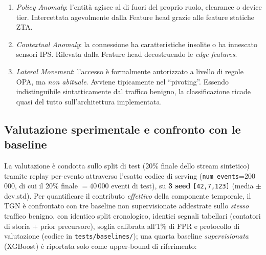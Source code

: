 \documentclass[11pt,a4paper]{report}
\begin{document}
\begin{enumerate}
    \item \textit{Policy Anomaly}: l'entità agisce al di fuori del proprio ruolo, clearance o device tier. Intercettata agevolmente dalla Feature head grazie alle feature statiche ZTA.
    \item \textit{Contextual Anomaly}: la connessione ha caratteristiche insolite o ha innescato sensori IPS. Rilevata dalla Feature head decostruendo le \textit{edge features}.
    \item \textit{Lateral Movement}: l'accesso è formalmente autorizzato a livello di regole OPA, ma \textit{non abituale}. Avviene tipicamente nel ``pivoting''. Essendo indistinguibile sintatticamente dal traffico benigno, la classificazione ricade quasi del tutto sull'architettura implementata.
\end{enumerate}

\subsection{Valutazione sperimentale e confronto con le baseline}
\label{sec:eval}

La valutazione è condotta sullo split di test (20\% finale dello stream sintetico) tramite replay per-evento attraverso l'esatto codice di serving (\texttt{num\_events}=200\,000, di cui il 20\% finale $=40\,000$ eventi di test), su \textbf{3 seed} \texttt{[42,7,123]} (media $\pm$ dev.std). Per quantificare il contributo \emph{effettivo} della componente temporale, il TGN è confrontato con tre baseline non supervisionate addestrate sullo \emph{stesso} traffico benigno, con identico split cronologico, identici segnali tabellari (contatori di storia + prior precursore), soglia calibrata all'1\% di FPR e protocollo di valutazione (codice in \texttt{tests/baselines/}); una quarta baseline \emph{supervisionata} (XGBoost) è riportata solo come upper-bound di riferimento:
\end{document}
